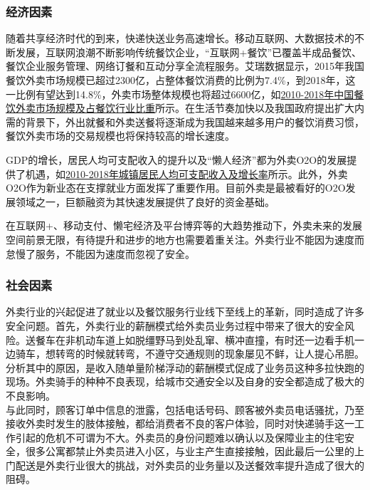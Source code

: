 \documentclass[violet]{main}
\begin{document}
			\subsubsection{经济因素}
				随着共享经济时代的到来，快递快送业务高速增长。移动互联网、大数据技术的不断发展，互联网浪潮不断影响传统餐饮企业，“互联网+餐饮”已覆盖半成品餐饮、餐饮企业服务管理、网络订餐和互动分享全流程服务。艾瑞数据显示，2015年我国餐饮外卖市场规模已超过2300亿，占整体餐饮消费的比例为7.4\%，到2018年，这一比例有望达到14.8\%，外卖市场整体规模也将超过6600亿，如\hyperlink{2010-2018年中国餐饮外卖市场规模及占餐饮行业比重}{2010-2018年中国餐饮外卖市场规模及占餐饮行业比重}所示。在生活节奏加快以及我国政府提出扩大内需的背景下，外出就餐和外卖送餐将逐渐成为我国越来越多用户的餐饮消费习惯，餐饮外卖市场的交易规模也将保持较高的增长速度。
				\begin{center}
					\Tcbset{}
				\end{center}
				\par GDP的增长，居民人均可支配收入的提升以及“懒人经济”都为外卖O2O的发展提供了机遇，如\hyperlink{2010-2018年城镇居民人均可支配收入及增长率}{2010-2018年城镇居民人均可支配收入及增长率}所示。此外，外卖O2O作为新业态在支撑就业方面发挥了重要作用。目前外卖是最被看好的O2O发展领域之一，巨额融资为其快速发展提供了良好的资金基础。
				\begin{center}
					\Tcbset{}
				\end{center}
				\par 在互联网+、移动支付、懒宅经济及平台博弈等的大趋势推动下，外卖未来的发展空间前景无限，有待提升和进步的地方也需要着重关注。外卖行业不能因为速度而怠慢了服务，不能因为速度而忽视了安全。
			\subsubsection{社会因素}
				外卖行业的兴起促进了就业以及餐饮服务行业线下至线上的革新，同时造成了许多安全问题。首先，外卖行业的薪酬模式给外卖员业务过程中带来了很大的安全风险。送餐车在非机动车道上如脱缰野马到处乱窜、横冲直撞，有时还一边看手机一边骑车，想转弯的时候就转弯，不遵守交通规则的现象屡见不鲜，让人提心吊胆。分析其中的原因，是收入随单量阶梯浮动的薪酬模式促成了业务员这种多拉快跑的现场。外卖骑手的种种不良表现，给城市交通安全以及自身的安全都造成了极大的不良影响。
				\\\indent 与此同时，顾客订单中信息的泄露，包括电话号码、顾客被外卖员电话骚扰，乃至接收外卖时发生的肢体接触，都给消费者不良的客户体验，同时对快递骑手这一工作引起的危机不可谓为不大。外卖员的身份问题难以确认以及保障业主的住宅安全，很多公寓都禁止外卖员进入小区，与业主产生直接接触，因此最后一公里的上门配送是外卖行业很大的挑战，对外卖员的业务量以及送餐效率提升造成了很大的阻碍。
\end{document}
